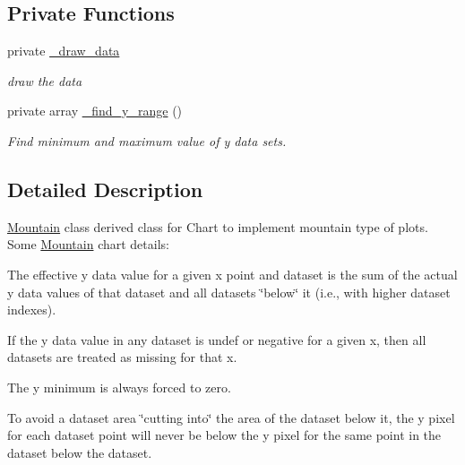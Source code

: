 \subsection*{Private Functions}
\label{_amgrp8d29cff216bafa3117e21883ea7c6b5f}
 \begin{DoxyCompactItemize}
\item 
\hypertarget{classChart_1_1Mountain_aaa146080e4c657cd36cfa2a233955e35}{
private \hyperlink{classChart_1_1Mountain_aaa146080e4c657cd36cfa2a233955e35}{\_\-draw\_\-data}}
\label{classChart_1_1Mountain_aaa146080e4c657cd36cfa2a233955e35}

\begin{DoxyCompactList}\small\item\em draw the data \item\end{DoxyCompactList}\item 
private array \hyperlink{classChart_1_1Mountain_a1da3590b6cb7bc51b8c192e1141a6fa3}{\_\-find\_\-y\_\-range} ()
\begin{DoxyCompactList}\small\item\em Find minimum and maximum value of y data sets. \item\end{DoxyCompactList}\end{DoxyCompactItemize}


\subsection{Detailed Description}
\hyperlink{classChart_1_1Mountain}{Mountain} class derived class for Chart to implement mountain type of plots. Some \hyperlink{classChart_1_1Mountain}{Mountain} chart details:

The effective y data value for a given x point and dataset is the sum of the actual y data values of that dataset and all datasets \char`\"{}below\char`\"{} it (i.e., with higher dataset indexes).

If the y data value in any dataset is undef or negative for a given x, then all datasets are treated as missing for that x.

The y minimum is always forced to zero.

To avoid a dataset area \char`\"{}cutting into\char`\"{} the area of the dataset below it, the y pixel for each dataset point will never be below the y pixel for the same point in the dataset below the dataset. 

